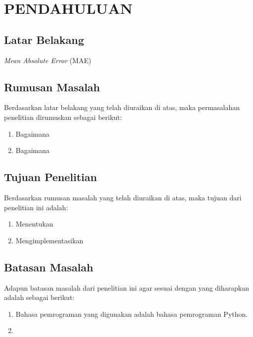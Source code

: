 \newpage
\pagestyle{fancy}
\fancyhf{}
\fancyhead[R]{\thepage}
\chapter{PENDAHULUAN} \label{Bab I}

\section{Latar Belakang} \label{I.Latar Belakang}
\textit{Mean Absolute Error} (MAE) \cite{knuth2001art}
\lipsum[1-3] %


\section{Rumusan Masalah} \label{I.Rumusan Masalah}

Berdasarkan latar belakang yang telah diuraikan di atas, maka permasalahan penelitian dirumuskan sebagai berikut: \par

\begin{enumerate}[noitemsep]
	\item Bagaimana
	\item Bagaimana 
\end{enumerate}


\section{Tujuan Penelitian} \label{I.Tujuan}
Berdasarkan rumusan masalah yang telah diuraikan di atas, maka tujuan dari penelitian ini adalah: \par

\begin{enumerate}[noitemsep]
	\item Menentukan 
	\item Mengimplementasikan
\end{enumerate}


\section{Batasan Masalah} \label{I.Batasan}
Adapun batasan masalah dari penelitian ini agar sesuai dengan yang diharapkan adalah sebagai berikut: \par

\begin{enumerate}[noitemsep]
    \item Bahasa pemrograman yang digunakan adalah bahasa pemrograman Python.
    \item 
\end{enumerate}


